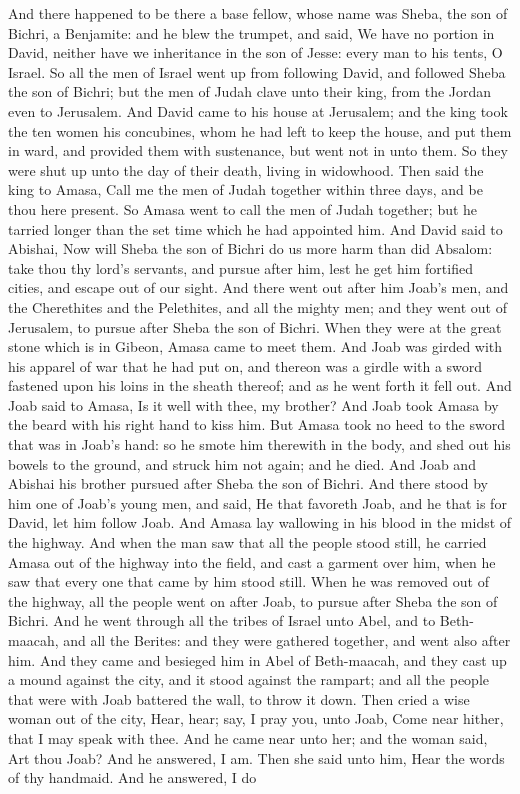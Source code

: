 And there happened to be there a base fellow, whose name was Sheba, the son of Bichri, a Benjamite: and he blew the trumpet, and said, We have no portion in David, neither have we inheritance in the son of Jesse: every man to his tents, O Israel. So all the men of Israel went up from following David, and followed Sheba the son of Bichri; but the men of Judah clave unto their king, from the Jordan even to Jerusalem.  And David came to his house at Jerusalem; and the king took the ten women his concubines, whom he had left to keep the house, and put them in ward, and provided them with sustenance, but went not in unto them. So they were shut up unto the day of their death, living in widowhood.  Then said the king to Amasa, Call me the men of Judah together within three days, and be thou here present. So Amasa went to call the men of Judah together; but he tarried longer than the set time which he had appointed him. And David said to Abishai, Now will Sheba the son of Bichri do us more harm than did Absalom: take thou thy lord’s servants, and pursue after him, lest he get him fortified cities, and escape out of our sight. And there went out after him Joab’s men, and the Cherethites and the Pelethites, and all the mighty men; and they went out of Jerusalem, to pursue after Sheba the son of Bichri. When they were at the great stone which is in Gibeon, Amasa came to meet them. And Joab was girded with his apparel of war that he had put on, and thereon was a girdle with a sword fastened upon his loins in the sheath thereof; and as he went forth it fell out. And Joab said to Amasa, Is it well with thee, my brother? And Joab took Amasa by the beard with his right hand to kiss him. But Amasa took no heed to the sword that was in Joab’s hand: so he smote him therewith in the body, and shed out his bowels to the ground, and struck him not again; and he died. And Joab and Abishai his brother pursued after Sheba the son of Bichri. And there stood by him one of Joab’s young men, and said, He that favoreth Joab, and he that is for David, let him follow Joab. And Amasa lay wallowing in his blood in the midst of the highway. And when the man saw that all the people stood still, he carried Amasa out of the highway into the field, and cast a garment over him, when he saw that every one that came by him stood still. When he was removed out of the highway, all the people went on after Joab, to pursue after Sheba the son of Bichri.  And he went through all the tribes of Israel unto Abel, and to Beth-maacah, and all the Berites: and they were gathered together, and went also after him. And they came and besieged him in Abel of Beth-maacah, and they cast up a mound against the city, and it stood against the rampart; and all the people that were with Joab battered the wall, to throw it down. Then cried a wise woman out of the city, Hear, hear; say, I pray you, unto Joab, Come near hither, that I may speak with thee. And he came near unto her; and the woman said, Art thou Joab? And he answered, I am. Then she said unto him, Hear the words of thy handmaid. And he answered, I do 